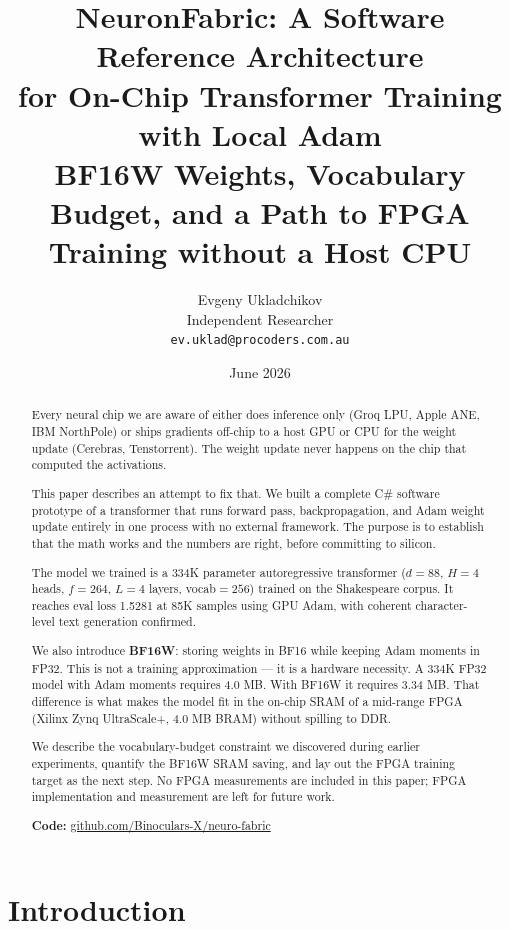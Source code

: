 \documentclass[11pt]{article}
\title{\textbf{NeuronFabric: A Software Reference Architecture\\
for On-Chip Transformer Training with Local Adam}\\[0.5em]
\large BF16W Weights, Vocabulary Budget, and a Path to FPGA Training without a Host CPU}
\author{
  Evgeny Ukladchikov \\
  Independent Researcher \\
  \texttt{ev.uklad@procoders.com.au} \\[0.3em]
  \small \href{\repourl}{\repourltext}
}
\date{June 2026}
\newcommand{\repourl}{https://github.com/Binoculars-X/neuro-fabric}
\newcommand{\repourltext}{github.com/Binoculars-X/neuro-fabric}
\begin{document}
\maketitle

\begin{abstract}

Every neural chip we are aware of either does inference only (Groq LPU, Apple ANE,
IBM NorthPole) or ships gradients off-chip to a host GPU or CPU for the weight update
(Cerebras, Tenstorrent). The weight update never happens on the chip that computed
the activations.

This paper describes an attempt to fix that. We built a complete C\# software prototype
of a transformer that runs forward pass, backpropagation, and Adam weight update
entirely in one process with no external framework. The purpose is to establish that
the math works and the numbers are right, before committing to silicon.

The model we trained is a 334K parameter autoregressive transformer
($d{=}88$, $H{=}4$ heads, $f{=}264$, $L{=}4$ layers, vocab$=256$) trained on the
Shakespeare corpus. It reaches eval loss 1.5281 at 85K samples using GPU Adam,
with coherent character-level text generation confirmed.

We also introduce \textbf{BF16W}: storing weights in BF16 while keeping Adam moments
in FP32. This is not a training approximation --- it is a hardware necessity.
A 334K FP32 model with Adam moments requires 4.0 MB. With BF16W it requires 3.34 MB.
That difference is what makes the model fit in the on-chip SRAM of a mid-range FPGA
(Xilinx Zynq UltraScale+, 4.0 MB BRAM) without spilling to DDR.

We describe the vocabulary-budget constraint we discovered during earlier experiments,
quantify the BF16W SRAM saving, and lay out the FPGA training target as the next step.
No FPGA measurements are included in this paper; FPGA implementation and measurement are left for future work.

\textbf{Code:} \href{\repourl}{\repourltext}

\end{abstract}

\section{Introduction}
\end{document}
